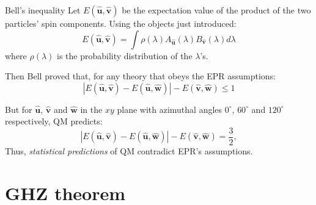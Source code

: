 \documentclass[10pt]{beamer}
\begin{document}
\begin{frame}{Bell's inequality}
Let $E(\mathbf{\hat{u}}, \mathbf{\hat{v}})$ be the expectation value of the product of the two particles' spin components. Using the objects just introduced:
\begin{equation*}
  E(\mathbf{\hat{u}}, \mathbf{\hat{v}}) = \int \rho(\lambda) A_{\mathbf{\hat{u}}}(\lambda) B_{\mathbf{\hat{v}}}(\lambda) d\lambda
\end{equation*}
where $\rho(\lambda)$ is the probability distribution of the $\lambda$'s.




Then Bell proved that, for any theory that obeys the EPR assumptions:
\begin{equation*}
  \left| E(\mathbf{\hat{u}}, \mathbf{\hat{v}}) - E(\mathbf{\hat{u}}, \mathbf{\hat{w}}) \right| - E(\mathbf{\hat{v}}, \mathbf{\hat{w}}) \leq 1
  \label{eq:bell-inequality}
\end{equation*}

But for $\mathbf{\hat{u}}$, $\mathbf{\hat{v}}$ and $\mathbf{\hat{w}}$ in the $xy$ plane with azimuthal angles $0^\circ$, $60^\circ$ and $120^\circ$ respectively, QM predicts:
\begin{equation*}
  \left| E(\mathbf{\hat{u}}, \mathbf{\hat{v}}) - E(\mathbf{\hat{u}}, \mathbf{\hat{w}}) \right| - E(\mathbf{\hat{v}}, \mathbf{\hat{w}}) = \frac{3}{2},
\end{equation*}
Thus, \emph{statistical predictions} of QM contradict EPR's assumptions.
\end{frame}




\section{GHZ theorem}
\end{document}

